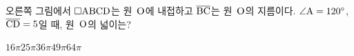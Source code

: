 \noindent\begin{minipage}[t]{0.58\linewidth}\vspace{0pt}\raggedright 오른쪽 그림에서 $\square\mathrm{ABCD}$는 원~$\mathrm{O}$에 내접하고 $\overline{\mathrm{BC}}$는 원~$\mathrm{O}$의 지름이다. $\angle\mathrm{A}=120^\circ$, $\overline{\mathrm{CD}}=5$일 때, 원~$\mathrm{O}$의 넓이는?\end{minipage}\hfill\begin{minipage}[t]{0.4\linewidth}\vspace{0pt}\centering \resizebox{\ifdim\width>\linewidth\linewidth\else\width\fi}{!}{}\end{minipage}\par
\begin{choicesii}{$16\pi$}{$25\pi$}{$36\pi$}{$49\pi$}{$64\pi$}\end{choicesii}
